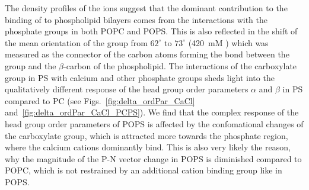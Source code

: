 The density profiles of the ions suggest that
the dominant contribution to the binding of  to phospholipid bilayers
comes from the interactions with the phosphate groups in both POPC and POPS. 
This is also reflected in the shift of the mean orientation 
of the  group from $62^\circ$ to $73^\circ$ (420~mM )
which was measured as the connector of the carbon atoms 
forming the bond between the group and the $\beta$-carbon of the phospholipid. 
The interactions of the carboxylate group in PS with calcium and other phosphate groups
sheds light into the qualitatively different response of the head group order parameters $\alpha$ and $\beta$ in PS compared to PC 
(see Figs.~\ref{fig:delta_ordPar_CaCl} and~\ref{fig:delta_ordPar_CaCl_PCPS}). 
We find that the complex response of the head group order parameters of POPS 
is affected by the confomational changes of the carboxylate group,
which is attracted more towards the phosphate region, 
where the calcium cations dominantly bind. 
This is also very likely the reason, 
why the magnitude of the P-N vector change in POPS is diminished compared to POPC, 
which is not restrained by an additional cation binding group like  in POPS. 


